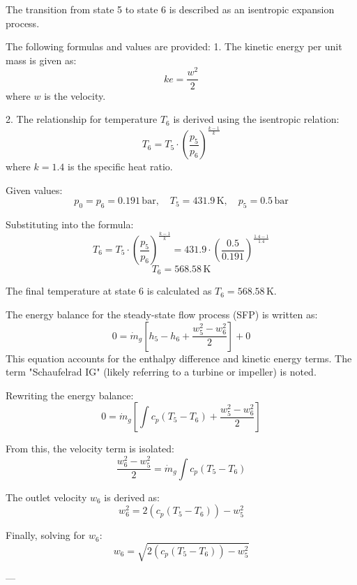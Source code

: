 The transition from state 5 to state 6 is described as an isentropic expansion process.  

The following formulas and values are provided:  
1. The kinetic energy per unit mass is given as:  
\[
ke = \frac{w^2}{2}
\]  
where \( w \) is the velocity.  

2. The relationship for temperature \( T_6 \) is derived using the isentropic relation:  
\[
T_6 = T_5 \cdot \left( \frac{p_5}{p_6} \right)^{\frac{k-1}{k}}
\]  
where \( k = 1.4 \) is the specific heat ratio.  

Given values:  
\[
p_0 = p_6 = 0.191 \, \text{bar}, \quad T_5 = 431.9 \, \text{K}, \quad p_5 = 0.5 \, \text{bar}
\]  

Substituting into the formula:  
\[
T_6 = T_5 \cdot \left( \frac{p_5}{p_6} \right)^{\frac{k-1}{k}} = 431.9 \cdot \left( \frac{0.5}{0.191} \right)^{\frac{1.4-1}{1.4}}
\]  
\[
T_6 = 568.58 \, \text{K}
\]  

The final temperature at state 6 is calculated as \( T_6 = 568.58 \, \text{K} \).

The energy balance for the steady-state flow process (SFP) is written as:  
\[
0 = \dot{m}_g \left[ h_5 - h_6 + \frac{w_5^2 - w_6^2}{2} \right] + 0
\]  
This equation accounts for the enthalpy difference and kinetic energy terms. The term "Schaufelrad IG" (likely referring to a turbine or impeller) is noted.  

Rewriting the energy balance:  
\[
0 = \dot{m}_g \left[ \int c_p (T_5 - T_6) + \frac{w_5^2 - w_6^2}{2} \right]
\]  

From this, the velocity term is isolated:  
\[
\frac{w_6^2 - w_5^2}{2} = \dot{m}_g \int c_p (T_5 - T_6)
\]  

The outlet velocity \( w_6 \) is derived as:  
\[
w_6^2 = 2 \left( c_p (T_5 - T_6) \right) - w_5^2
\]  

Finally, solving for \( w_6 \):  
\[
w_6 = \sqrt{2 \left( c_p (T_5 - T_6) \right) - w_5^2}
\]  

---
